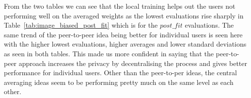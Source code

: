 \documentclass[12pt]{article}
\begin{document}
\begin{table}[H] %
\def\arraystretch{1.2}%
\caption{Images dataset: Post fit results at the end of the rounds from testing user models with $P = 0.7$.} \label{tab:image_biased_post_fit}
\end{table}
\noindent From the two tables we can see that the local training helps out the users not performing well on the averaged weights as the lowest evaluations rise sharply in Table~\ref{tab:image_biased_post_fit} which is for the $post\_fit$ evaluations. The same trend of the peer-to-peer idea being better for individual users is seen here with the higher lowest evaluations, higher averages and lower standard deviations as seen in both tables. This made us more confident in saying that the peer-to-peer approach increases the privacy by decentralising the process and gives better performance for individual users. Other than the peer-to-per ideas, the central averaging ideas seem to be performing pretty much on the same level as each other.
\end{document}
